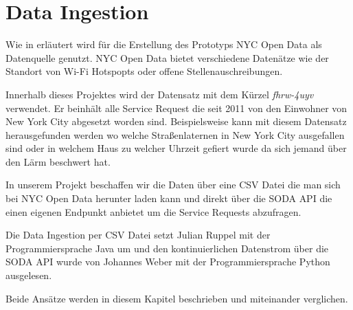 \section{Data Ingestion}

Wie in  erläutert wird für die Erstellung des Prototyps NYC Open Data als Datenquelle genutzt.
NYC Open Data bietet verschiedene Datenätze wie \zb{} der Standort von Wi-Fi Hotspopts oder offene Stellenauschreibungen.\autocite{NYCOpenDataExample}

Innerhalb dieses Projektes wird der Datensatz mit dem Kürzel \textit{fhrw-4uyv} verwendet.
Er beinhält alle Service Request die seit 2011 von den Einwohner von New York City abgesetzt worden sind.
Beispielsweise kann mit diesem Datensatz herausgefunden werden wo welche Straßenlaternen in New York City ausgefallen sind
oder in welchem Haus zu welcher Uhrzeit gefiert wurde da sich jemand über den Lärm beschwert hat.

In unserem Projekt beschaffen wir die Daten über eine \ac{CSV} Datei die man sich bei NYC Open Data herunter laden kann
und direkt über die \ac{SODA} \ac{API} die einen eigenen Endpunkt anbietet um die Service Requests abzufragen.

Die Data Ingestion per \ac{CSV} Datei setzt Julian Ruppel mit der Programmiersprache Java um und
den kontinuierlichen Datenstrom über die \ac{SODA} \ac{API} wurde von Johannes Weber mit der Programmiersprache Python
ausgelesen.

Beide Ansätze werden in diesem Kapitel beschrieben und miteinander verglichen.



